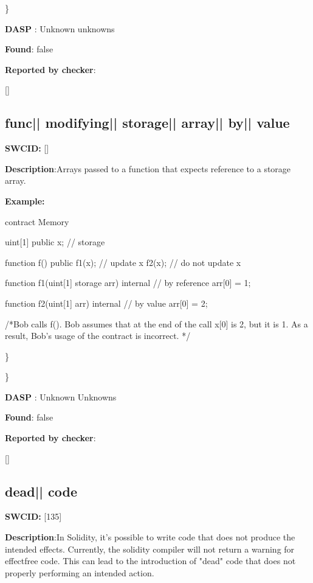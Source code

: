 \documentclass{article}
\begin{document}
\} 

\textbf{DASP} : Unknown unknowns

\textbf{Found}: false

\textbf{Reported by checker}: 
\begin{ffcode} 

[]
\end{ffcode} 
\subsection{func{|\textunderscore| }modifying{|\textunderscore| }storage{|\textunderscore| }array{|\textunderscore| }by{|\textunderscore| }value} 
\textbf{SWC{\textunderscore }ID:} []

\textbf{Description}:Arrays passed to a function that expects reference to a storage array.


\textbf{Example:} 
\begin{ffcode} 

contract Memory {
    uint[1] public x; // storage

    function f() public {
        f1(x); // update x
        f2(x); // do not update x
    }

    function f1(uint[1] storage arr) internal { // by reference
        arr[0] = 1;
    }

    function f2(uint[1] arr) internal { // by value
        arr[0] = 2;
    }
}

 /*Bob calls f(). Bob assumes that at the end of the call x[0] is 2, but it is 1. As a result, Bob's usage of the contract is incorrect. */ 

\end{ffcode} 
\} 

\} 

\textbf{DASP} : Unknown Unknowns

\textbf{Found}: false

\textbf{Reported by checker}: 
\begin{ffcode} 

[]
\end{ffcode} 
\subsection{dead{|\textunderscore| }code} 
\textbf{SWC{\textunderscore }ID:} [135]

\textbf{Description}:In Solidity, it's possible to write code that does not produce the intended effects. Currently, the solidity compiler will not return a warning for effect{\textendash}free code. This can lead to the introduction of "dead" code that does not properly performing an intended action.
\end{document}

